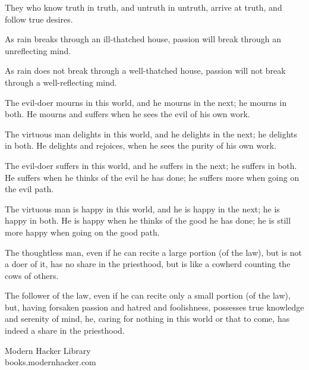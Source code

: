 \documentclass[12pt]{article}
\begin{document}
 They who know truth in truth, and untruth in untruth, arrive at
truth, and follow true desires.


 As rain breaks through an ill-thatched house, passion will break
through an unreflecting mind.


 As rain does not break through a well-thatched house, passion will
not break through a well-reflecting mind.


 The evil-doer mourns in this world, and he mourns in the next; he
mourns in both.  He mourns and suffers when he sees the evil of his
own work.


 The virtuous man delights in this world, and he delights in the
next; he delights in both.  He delights and rejoices, when he sees the
purity of his own work.


 The evil-doer suffers in this world, and he suffers in the next;
he suffers in both.  He suffers when he thinks of the evil he has
done; he suffers more when going on the evil path.


 The virtuous man is happy in this world, and he is happy in the
next; he is happy in both.  He is happy when he thinks of the good he
has done; he is still more happy when going on the good path.


 The thoughtless man, even if he can recite a large portion (of the
law), but is not a doer of it, has no share in the priesthood, but is
like a cowherd counting the cows of others.


 The follower of the law, even if he can recite only a small
portion (of the law), but, having forsaken passion and hatred and
foolishness, possesses true knowledge and serenity of mind, he, caring
for nothing in this world or that to come, has indeed a share in the
priesthood.




\vfill
\begin{center}
{\selectfont 
Modern Hacker Library\\books.modernhacker.com}
\end{center}
\end{document}
